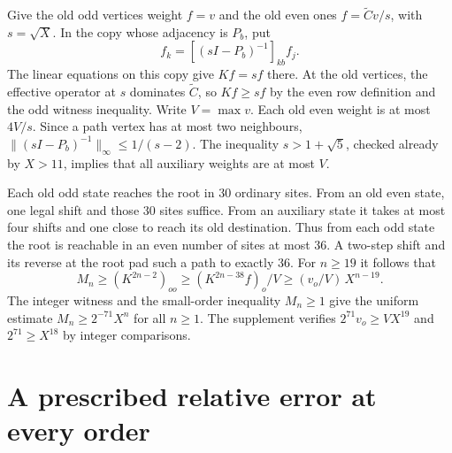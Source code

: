 \documentclass[11pt]{article}
\newcommand{\prefbits}{71}
\begin{document}
Give the old odd vertices weight \(f=v\) and the old even ones \(f=\widetilde C v/s\), with \(s=\sqrt X\). In the copy whose adjacency is \(P_b\), put
\[
 f_k=[(sI-P_b)^{-1}]_{kb}f_j .
\]
The linear equations on this copy give \(Kf=sf\) there. At the old vertices, the effective operator at \(s\) dominates \(\widetilde C\), so \(Kf\ge sf\) by the even row definition and the odd witness inequality. Write \(V=\max v\). Each old even weight is at most \(4V/s\). Since a path vertex has at most two neighbours, \(\|(sI-P_b)^{-1}\|_\infty\le1/(s-2)\). The inequality \(s>1+\sqrt5\), checked already by \(X>11\), implies that all auxiliary weights are at most \(V\).

Each old odd state reaches the root in 30 ordinary sites. From an old even state, one legal shift and those 30 sites suffice. From an auxiliary state it takes at most four shifts and one close to reach its old destination. Thus from each odd state the root is reachable in an even number of sites at most 36. A two-step shift and its reverse at the root pad such a path to exactly 36. For \(n\ge19\) it follows that
\[
 M_n\ge(K^{2n-2})_{oo}\ge (K^{2n-38}f)_o/V
       \ge (v_o/V)\,X^{n-19}.
\]
The integer witness and the small-order inequality \(M_n\ge1\) give the uniform estimate \(M_n\ge2^{-\prefbits}X^n\) for all \(n\ge1\). The supplement verifies \(2^{\prefbits}v_o\ge V X^{19}\) and \(2^{\prefbits}\ge X^{18}\) by integer comparisons.


\section{A prescribed relative error at every order}
\end{document}

